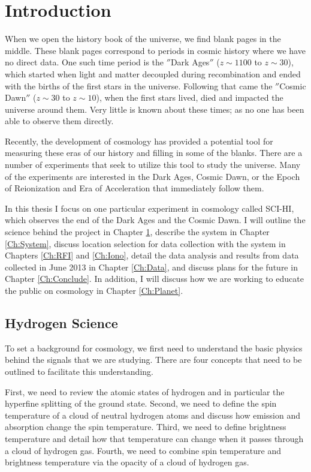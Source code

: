 \chapter{Introduction}\label{Ch:Intro}
When we open the history book of the universe, we find blank pages in the middle. These blank pages correspond to periods in cosmic history where we have no direct data. One such time period is the $''$Dark Ages$''$ ($z \sim 1100$ to $z \sim 30$), which started when light and matter decoupled during recombination and ended with the births of the first stars in the universe. Following that came the $''$Cosmic Dawn$''$ ($z\sim 30$ to $z\sim 10$), when the first stars lived, died and impacted the universe around them. Very little is known about these times; as no one has been able to observe them directly. 

Recently, the development of \cm cosmology has provided a potential tool for measuring these eras of our history and filling in some of the blanks. There are a number of experiments that seek to utilize this tool to study the universe. Many of the experiments are interested in the Dark Ages, Cosmic Dawn, or the Epoch of Reionization and Era of Acceleration that immediately follow them.  

In this thesis I focus on one particular experiment in \cm cosmology called SCI-HI, which observes the end of the Dark Ages and the Cosmic Dawn. I will outline the science behind the project in Chapter \ref{Ch:Intro}, describe the system in Chapter \ref{Ch:System}, discuss location selection for data collection with the system in Chapters \ref{Ch:RFI} and \ref{Ch:Iono}, detail the data analysis and results from data collected in June 2013 in Chapter \ref{Ch:Data}, and discuss plans for the future in Chapter \ref{Ch:Conclude}. In addition, I will discuss how we are working to educate the public on \cm cosmology in Chapter \ref{Ch:Planet}. 

\section{Hydrogen \cm Science}
To set a background for \cm cosmology, we first need to understand the basic physics behind the signals that we are studying. There are four concepts that need to be outlined to facilitate this understanding. 

First, we need to review the atomic states of hydrogen and in particular the hyperfine splitting of the ground state. Second, we need to define the spin temperature of a cloud of neutral hydrogen atoms and discuss how emission and absorption change the spin temperature. Third, we need to define brightness temperature and detail how that temperature can change when it passes through a cloud of hydrogen gas. Fourth, we need to combine spin temperature and brightness temperature via the opacity of a cloud of hydrogen gas. 

